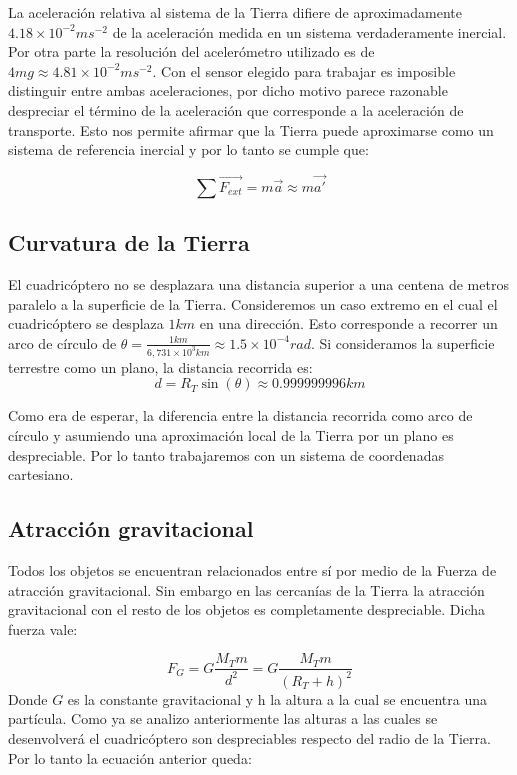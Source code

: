 \documentclass[main]{subfiles}
\begin{document}
La aceleraci\'on relativa al sistema de la Tierra difiere de  aproximadamente $4.18\times10^{-2}ms^{-2}$ de la aceleraci\'on medida en un sistema verdaderamente inercial. Por otra parte la resoluci\'on del aceler\'ometro utilizado es de $4mg\approx 4.81\times10^{-2}ms^{-2}$. Con el sensor elegido para trabajar es imposible distinguir entre ambas aceleraciones, por dicho motivo parece razonable despreciar el t\'ermino de la aceleraci\'on que corresponde a la aceleraci\'on de transporte. Esto nos permite afirmar que la Tierra puede aproximarse como un sistema de referencia inercial y por lo tanto se cumple que:

\begin{equation}
\sum \vec{F_{ext}}=m\vec{a}\approx m\vec{a\prime}
\end{equation}



\subsection{Curvatura de la Tierra}
El cuadric\'optero no se desplazara una distancia superior a una centena de metros paralelo a la superficie de la Tierra. Consideremos un caso extremo en el cual el cuadric\'optero se desplaza $1km$ en una direcci\'on. Esto corresponde a recorrer un arco de c\'irculo de $\theta = \frac{1km}{6,731\times10^{3}km}\approx 1.5\times 10^{-4}rad$. Si consideramos la superficie terrestre como un plano, la distancia recorrida es: 
\begin{equation}
d=R_T\sin(\theta) \approx 0.999999996km
\end{equation}

Como era de esperar, la diferencia entre la distancia recorrida como arco de c\'irculo y asumiendo una aproximaci\'on local de la Tierra por un plano es despreciable. Por lo tanto trabajaremos con un sistema de coordenadas cartesiano.
\subsection{Atracci\'on gravitacional}
Todos los objetos se encuentran relacionados entre s\'i por medio de la Fuerza de atracci\'on gravitacional. Sin embargo en las cercan\'ias de la Tierra la atracci\'on gravitacional con el resto de los objetos es completamente despreciable. Dicha fuerza vale:

\begin{equation}
F_G=G\frac{M_Tm}{d^2}=G\frac{M_Tm}{(R_T+h)^2} 
\end{equation}
Donde $G$ es la constante gravitacional y h la altura a la cual se encuentra una part\'icula.  
Como ya se analizo anteriormente las alturas a las cuales se desenvolver\'a el cuadric\'optero son despreciables respecto del radio de la Tierra. Por lo tanto la ecuaci\'on anterior queda:
\end{document}
